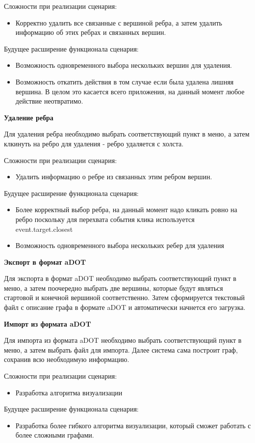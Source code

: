 Сложности при реализации сценария:
\begin{itemize}
	\item Корректно удалить все связанные с вершиной ребра, а затем удалить информацию об этих ребрах и связанных вершин.
\end{itemize}

Будущее расширение функционала сценария:
\begin{itemize}
	\item Возможность одновременного выбора нескольких вершин для удаления.
	\item Возможность откатить действия в том случае если была удалена лишняя вершина. В целом это касается всего приложения, на данный момент любое действие неотвратимо.
\end{itemize}

\textbf{Удаление ребра}

Для удаления ребра необходимо выбрать соответствующий пункт в меню, а затем клкинуть на ребро для удаления - ребро удаляется с холста.

Сложности при реализации сценария:
\begin{itemize}
	\item Удалить информацию о ребре из связанных этим ребром вершин.
\end{itemize}

Будущее расширение функционала сценария:
\begin{itemize}
	\item Более корректный выбор ребра, на данный момент надо кликать ровно на ребро поскольку для перехвата события клика используется event.target.closest
	\item Возможность одновременного выбора нескольких ребер для удаления
\end{itemize}

\textbf{Экспорт в формат aDOT}

Для экспорта в формат aDOT необходимо выбрать соответствующий пункт в меню, а затем поочередно выбрать две вершины, которые будут являться стартовой и конечной вершиной соответственно. Затем сформируется текстовый файл с описание графа в формате aDOT и автоматически начнется его загрузка.

\textbf{Импорт из формата aDOT}

Для импорта из формата aDOT необходимо выбрать соответствующий пункт в меню, а затем выбрать файл для импорта. Далее система сама построит граф, сохранив всю необходимую информацию.

Сложности при реализации сценария:
\begin{itemize}
	\item Разработка алгоритма визуализации
\end{itemize}

Будущее расширение функционала сценария:
\begin{itemize}
	\item Разработка более гибкого алгоритма визуализации, который сможет работать с более сложными графами.
\end{itemize}

















